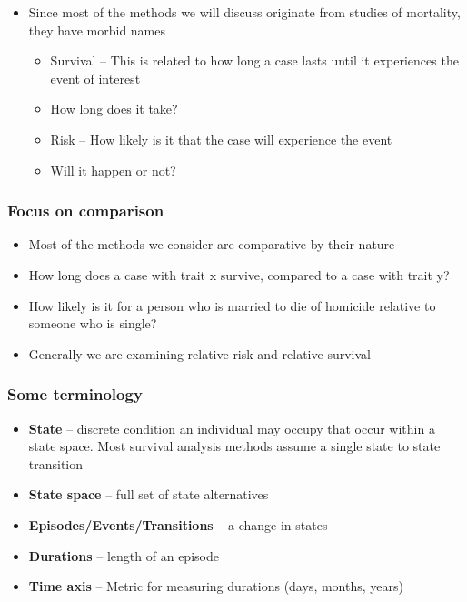 \documentclass[
]{article}
\providecommand{\tightlist}{%
  \setlength{\itemsep}{0pt}\setlength{\parskip}{0pt}}
\begin{document}
\begin{itemize}
\tightlist
\item
  Since most of the methods we will discuss originate from studies of mortality, they have morbid names

  \begin{itemize}
  \tightlist
  \item
    Survival -- This is related to how long a case lasts until it experiences the event of interest
  \item
    How long does it take?
  \item
    Risk -- How likely is it that the case will experience the event
  \item
    Will it happen or not?
  \end{itemize}
\end{itemize}

\hypertarget{focus-on-comparison}{%
\subsubsection{Focus on comparison}\label{focus-on-comparison}}

\begin{itemize}
\tightlist
\item
  Most of the methods we consider are comparative by their nature
\item
  How long does a case with trait x survive, compared to a case with trait y?
\item
  How likely is it for a person who is married to die of homicide relative to someone who is single?
\item
  Generally we are examining relative risk and relative survival
\end{itemize}

\hypertarget{some-terminology}{%
\subsubsection{Some terminology}\label{some-terminology}}

\begin{itemize}
\tightlist
\item
  \textbf{State} -- discrete condition an individual may occupy that occur within a state space. Most survival analysis methods assume a single state to state transition
\item
  \textbf{State space} -- full set of state alternatives
\item
  \textbf{Episodes/Events/Transitions} -- a change in states
\item
  \textbf{Durations} -- length of an episode
\item
  \textbf{Time axis} -- Metric for measuring durations (days, months, years)
\end{itemize}
\end{document}

